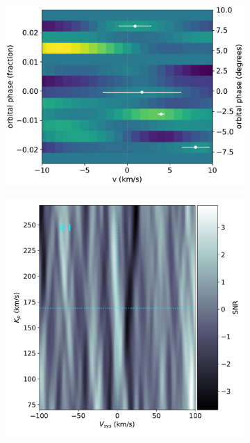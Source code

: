 \documentclass[twocolumn]{aastex631}
\begin{document}
\begin{figure}[ht!]
\begin{subfigure}[b]{0.333\textwidth}
            \end{subfigure}
            \begin{subfigure}[b]{0.333\textwidth}\label{fig:wind-chars-Co-combined}
                \includegraphics[width=\textwidth]{plots-updated/line-velocity/binned/pcolor/points/KELT-20b.Co.phase-binned+RVs.pdf}
                
            \end{subfigure}

            \begin{subfigure}[b]{0.333\textwidth}\label{fig:2d-ccf-V-combined}
                \includegraphics[width=\textwidth]{plots-updated/kp-vsys-map/blue/KELT-20b.20190504.blue.V.CCFs-shifted.pdf}
                

\end{subfigure}
\end{figure}
\end{document}
